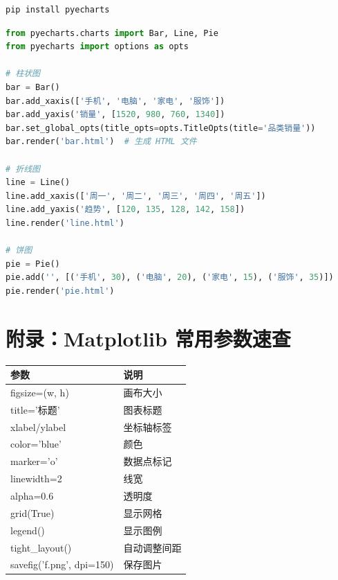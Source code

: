 \documentclass[12pt,a4paper]{article}
\begin{document}
\begin{lstlisting}[language=bash]
pip install pyecharts
\end{lstlisting}

\begin{lstlisting}[language=Python]
from pyecharts.charts import Bar, Line, Pie
from pyecharts import options as opts

# 柱状图
bar = Bar()
bar.add_xaxis(['手机', '电脑', '家电', '服饰'])
bar.add_yaxis('销量', [1520, 980, 760, 1340])
bar.set_global_opts(title_opts=opts.TitleOpts(title='品类销量'))
bar.render('bar.html')  # 生成 HTML 文件

# 折线图
line = Line()
line.add_xaxis(['周一', '周二', '周三', '周四', '周五'])
line.add_yaxis('趋势', [120, 135, 128, 142, 158])
line.render('line.html')

# 饼图
pie = Pie()
pie.add('', [('手机', 30), ('电脑', 20), ('家电', 15), ('服饰', 35)])
pie.render('pie.html')
\end{lstlisting}

\section{附录：Matplotlib 常用参数速查}

{\footnotesize
\begin{longtable}{ll}
\toprule
\textbf{参数} & \textbf{说明} \\
\midrule
figsize=(w, h) & 画布大小 \\
title='标题' & 图表标题 \\
xlabel/ylabel & 坐标轴标签 \\
color='blue' & 颜色 \\
marker='o' & 数据点标记 \\
linewidth=2 & 线宽 \\
alpha=0.6 & 透明度 \\
grid(True) & 显示网格 \\
legend() & 显示图例 \\
tight\_layout() & 自动调整间距 \\
savefig('f.png', dpi=150) & 保存图片 \\
\bottomrule
\end{longtable}
}
\end{document}
